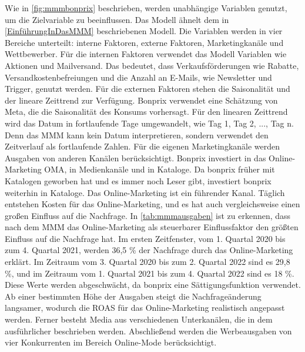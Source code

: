 Wie in \autoref{fig:mmmbonprix} beschrieben, werden unabhängige Variablen genutzt, um die Zielvariable  zu beeinflussen. Das Modell ähnelt dem in \autoref{EinführungInDasMMM} beschriebenen Modell. Die Variablen werden in vier Bereiche unterteilt: interne Faktoren, externe Faktoren, Marketingkanäle und Wettbewerber. Für die internen Faktoren verwendet das Modell Variablen wie Aktionen und Mailversand. Das bedeutet, dass Verkaufsförderungen wie Rabatte, Versandkostenbefreiungen und die Anzahl an E-Mails, wie Newsletter und Trigger, genutzt werden. Für die externen Faktoren stehen die Saisonalität und der lineare Zeittrend zur Verfügung. Bonprix verwendet eine Schätzung von Meta, die die Saisonalität des Konsums vorhersagt. Für den linearen Zeittrend wird das Datum in fortlaufende Tage umgewandelt, wie Tag 1, Tag 2, ..., Tag n. Denn das \ac{MMM} kann kein Datum interpretieren, sondern verwendet den Zeitverlauf als fortlaufende Zahlen. Für die eigenen Marketingkanäle werden Ausgaben von anderen Kanälen berücksichtigt. Bonprix investiert in das Online-Marketing \ac{OMA}, in Medienkanäle und in Kataloge. Da bonprix früher mit Katalogen geworben hat und es immer noch Leser gibt, investiert bonprix weiterhin in Kataloge. Das Online-Marketing ist ein führender Kanal. Täglich entstehen Kosten für das Online-Marketing, und es hat auch vergleichsweise einen großen Einfluss auf die Nachfrage. In 
\autoref{tab:mmmausgaben} ist zu erkennen, dass nach dem \ac{MMM} das Online-Marketing als steuerbarer Einflussfaktor den größten Einfluss auf die Nachfrage hat. Im ersten Zeitfenster, vom 1. Quartal 2020 bis zum 4. Quartal 2021, werden 36,5 \% der Nachfrage durch das Online-Marketing erklärt. Im Zeitraum vom 3. Quartal 2020 bis zum 2. Quartal 2022 sind es 29,8 \%, und im Zeitraum vom 1. Quartal 2021 bis zum 4. Quartal 2022 sind es 18 \%. Diese Werte werden abgeschwächt, da bonprix eine Sättigungsfunktion verwendet. Ab einer bestimmten Höhe der Ausgaben steigt die Nachfrageänderung langsamer, wodurch die ROAS für das Online-Marketing realistisch angepasst werden. Ferner besteht Media aus verschiedenen Unterkanälen, die in dem  ausführlicher beschrieben werden. Abschließend werden die Werbeausgaben von vier Konkurrenten im Bereich Online-Mode berücksichtigt.\\\\

